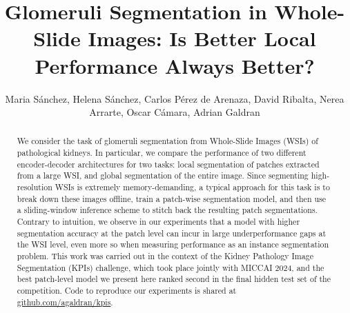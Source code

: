 \documentclass[runningheads]{llncs}
\begin{document}
\title{Glomeruli Segmentation in Whole-Slide Images: Is Better Local Performance Always Better?}




\author{Maria Sánchez, Helena Sánchez, Carlos Pérez de Arenaza, David Ribalta, Nerea Arrarte, Oscar Cámara, Adrian Galdran}





%
\maketitle              %
%
\begin{abstract}
We consider the task of glomeruli segmentation from Whole-Slide Images (WSIs) of pathological kidneys.
In particular, we compare the performance of two different encoder-decoder architectures for two tasks: local segmentation of patches extracted from a large WSI, and global segmentation of the entire image. 
Since segmenting high-resolution WSIs is extremely memory-demanding, a typical approach for this task is to break down these images offline, train a patch-wise segmentation model, and then use a sliding-window inference scheme to stitch back the resulting patch segmentations. 
Contrary to intuition, we observe in our experiments that a model with higher segmentation accuracy at the patch level can incur in large underperformance gaps at the WSI level, even more so when measuring performance as an instance segmentation problem. 
This work was carried out in the context of the Kidney Pathology Image Segmentation (KPIs) challenge, which took place jointly with MICCAI 2024, and the best patch-level model we present here ranked second in the final hidden test set of the competition. Code to reproduce our experiments is shared at \href{https://github.com/agaldran/kpis}{\url{github.com/agaldran/kpis}}.









\end{abstract}


\setcounter{footnote}{0} 
\end{document}

